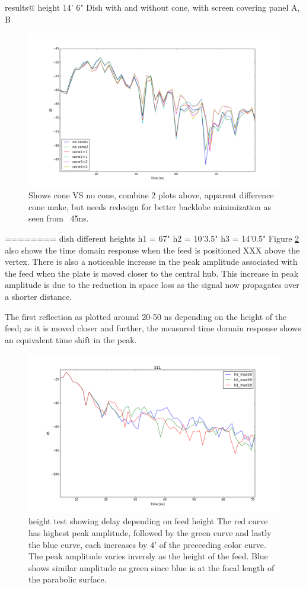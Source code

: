 \documentclass[preprint]{aastex}  %
\begin{document}
results@ height 14' 6"
Dish with and without cone, with screen covering panel A, B

\begin{figure}[H]
	\begin{center}
	\includegraphics[width =.7\textwidth]{reflectometry_plots/May5/S11_1st2nd_refl}
	\caption{Shows cone VS no cone, combine 2 plots above, apparent difference cone make, but needs redesign for better backlobe minimization as seen from ~45ns.
\label{Fig:conetest} }
	\end{center}
\end{figure}

========
dish different heights
h1 = 67"
h2 = 10'3.5"
h3 = 14'0.5"
Figure \ref{Fig:height_test} also shows the time domain response when the feed is positioned XXX above the vertex.
There is also a noticeable increase in the peak amplitude associated with the feed when the plate is moved closer to the central hub. 
This increase in peak amplitude is due to the reduction in space loss as the signal now propagates over a shorter distance.


The first reflection as plotted around 20-50 ns depending on the height of the feed; as it is moved
closer and further, the measured time domain response shows an equivalent time shift in the peak. 

\begin{figure}[H]
	\begin{center}
	\includegraphics[width =.7\textwidth]{reflectometry_plots/Mar28/height_test_zoom}
	\caption{height test showing delay depending on feed height
The red curve has highest peak amplitude, followed by the green curve and lastly the blue curve, each increases by 4' of the preceeding color curve. The peak amplitude varies inversly as the height of the feed. Blue shows similar amplitude as green since blue is at the focal length of the parabolic surface.
\label{Fig:height_test} }
	\end{center}
\end{figure}
\end{document}
